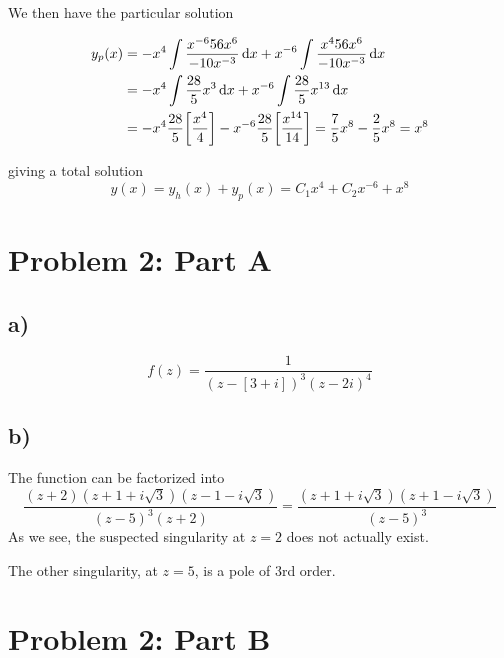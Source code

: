 \documentclass[10pt,a4paper]{article}
\begin{document}
We then have the particular solution

\begin{align}
    y_p(x) &= -x^4\int \frac{x^{-6}56x^6}{-10x^{-3}}\dd{x} + x^{-6} \int \frac{x^4 56 x^6}{-10x^{-3}} \dd{x} \\
    &= -x^4\int\frac{28}{5}x^3 \dd{x} + x^{-6} \int \frac{28}{5}x^{13} \dd{x} \\
    &= -x^4\frac{28}{5}\qty[\frac{x^4}{4}] - x^{-6}\frac{28}{5}\qty[\frac{x^{14}}{14}] = \frac{7}{5}x^8 - \frac{2}{5}x^8 = x^8
\end{align}

giving a total solution
\begin{equation}
    y(x) = y_h(x) + y_p(x) = C_1x^4 + C_2x^{-6} + x^8
\end{equation}

\section*{Problem 2: Part A}
\subsection*{a)}

\begin{equation}
    f(z) = \frac{1}{(z-[3+i])^3(z-2i)^4}
\end{equation}


\subsection*{b)}
The function can be factorized into
\begin{equation}
    \frac{(z+2)(z+1+i\sqrt{3})(z-1-i\sqrt{3})}{(z-5)^3(z+2)} = \frac{(z+1+i\sqrt{3})(z+1-i\sqrt{3})}{(z-5)^3}
\end{equation}
As we see, the suspected singularity at $z=2$ does not actually exist.

The other singularity, at $z=5$, is a pole of 3rd order. 



\section*{Problem 2: Part B}
\end{document}
